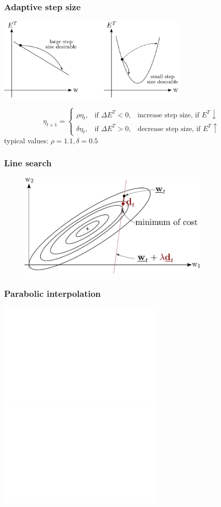 \begin{frame} \frametitle{Adaptive step size}
\begin{center} \includegraphics[height=4cm]{img/section1_fig25.pdf} \end{center}
\[ \eta_{t + 1} = \left \{ 
	\begin{array}{lll}
		\rho \eta_t, 
			& \text{if } \Delta E^T < 0,
			& \text{increase step size, if } E^T \downarrow \\
		\delta \eta_t, 
			& \text{if } \Delta E^T > 0,
			& \text{decrease step size, if } E^T \uparrow 
	\end{array} \right.
\]
typical values: $\rho = 1.1, \delta = 0.5$
\end{frame}

\begin{frame}\frametitle{Line search}
   \begin{figure}[h]
    \centering   
    \includegraphics[height=5cm]{img/section1_fig26}
    \end{figure}
\end{frame}

\begin{frame}\frametitle{Parabolic interpolation}
	\begin{center} 
		\includegraphics<1>[height=5cm]{img/parabolicInterpolation_clean_a.pdf} 
		\includegraphics<2>[height=5cm]{img/parabolicInterpolation_clean_b.pdf} 
	\end{center}
\end{frame}


